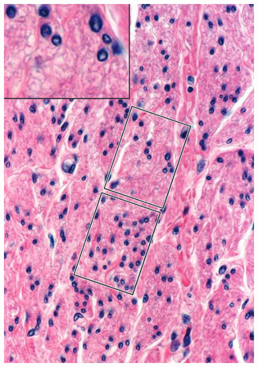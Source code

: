 \begin{itemize}
\begin{center}
    \includegraphics[scale=0.25]{images/week-1-rp14.jpg}
  \end{center}
\end{itemize}